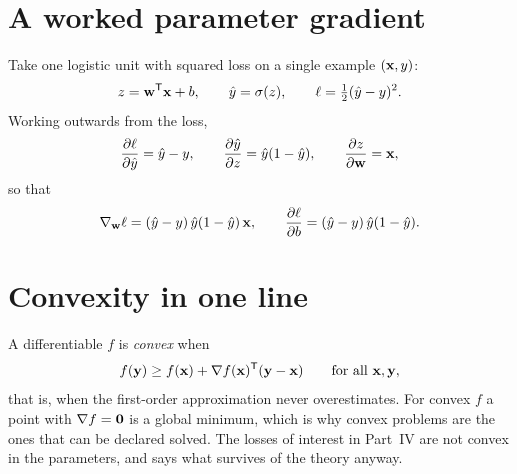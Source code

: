 \section{A worked parameter gradient}

Take one logistic unit with squared loss on a single example \((\mathbf{x},y)\):
\[
	z=\mathbf{w}^{\mathsf{T}}\mathbf{x}+b,
	\qquad
	\hat y=\sigma(z),
	\qquad
	\ell=\tfrac12(\hat y-y)^{2}.
\]
Working outwards from the loss,
\[
	\frac{\partial\ell}{\partial\hat y}=\hat y-y,
	\qquad
	\frac{\partial\hat y}{\partial z}=\hat y(1-\hat y),
	\qquad
	\frac{\partial z}{\partial\mathbf{w}}=\mathbf{x},
\]
so that
\[
	\nabla_{\mathbf{w}}\ell=(\hat y-y)\,\hat y(1-\hat y)\,\mathbf{x},
	\qquad
	\frac{\partial\ell}{\partial b}=(\hat y-y)\,\hat y(1-\hat y).
\]


\section{Convexity in one line}

A differentiable \(f\) is \emph{convex} when
\[
	f(\mathbf{y})\ge f(\mathbf{x})+\nabla f(\mathbf{x})^{\mathsf{T}}(\mathbf{y}-\mathbf{x})
	\qquad\text{for all }\mathbf{x},\mathbf{y},
\]
that is, when the first-order approximation never overestimates. For convex
\(f\) a point with \(\nabla f=\mathbf{0}\) is a global minimum, which is why
convex problems are the ones that can be declared solved. The losses of interest
in Part~IV are not convex in the parameters, and  says
what survives of the theory anyway.
